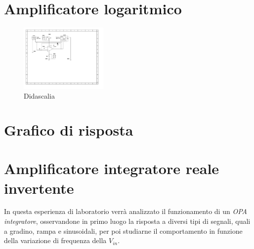 \documentclass[journal]{IEEEtran}
\begin{document}

\section{Amplificatore logaritmico} %

\begin{figure}[H]%
\begin {center}
\includegraphics[width=0.38\textwidth]{sch-simulations/output/OPA-log.pdf}
\caption{Didascalia}
\label{fig:oscilloscope}
\end {center}
\end{figure}

\section{Grafico di risposta}


\section{Amplificatore integratore reale invertente} %
In questa esperienza di laboratorio verrà analizzato il funzionamento di un \textit{OPA integratore}, osservandone in primo luogo la risposta a diversi tipi di segnali, quali a gradino, rampa e sinusoidali, per poi studiarne il comportamento in funzione della variazione di frequenza della $V_{in}$.
\end{document}
